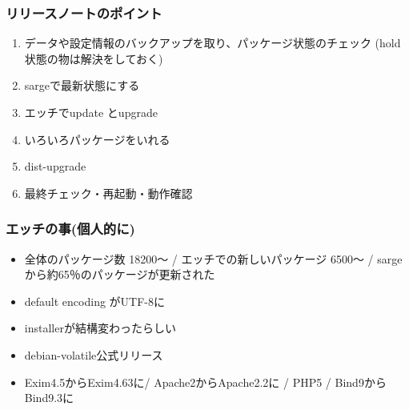 \documentclass[mingoth,a4paper]{jsarticle}
\begin{document}
\subsubsection{リリースノートのポイント}
\begin{enumerate}
\item データや設定情報のバックアップを取り、パッケージ状態のチェック (hold状態の物は解決をしておく)
\item sargeで最新状態にする

\item エッチでupdate とupgrade
\item いろいろパッケージをいれる

\item dist-upgrade
\item 最終チェック・再起動・動作確認
\end{enumerate}
\subsubsection {エッチの事(個人的に)}
\begin{itemize}
\item 全体のパッケージ数 18200〜 / エッチでの新しいパッケージ 6500〜 / sargeから約65％のパッケージが更新された
\item default encoding がUTF-8に
\item installerが結構変わったらしい
\item debian-volatile公式リリース
\item Exim4.5からExim4.63に/ Apache2からApache2.2に / PHP5 / Bind9からBind9.3に
\end{itemize}
\end{document}
